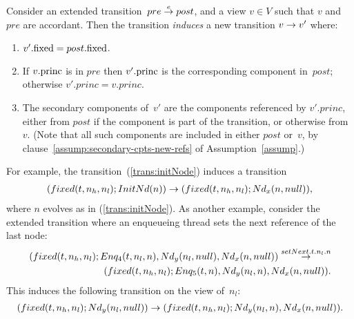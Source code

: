 \begin{definition}
\label{def:induced-transition}
Consider an extended transition~$pre \stackrel{e}\rightarrow post$, and a view $v \in V$
such that $v$ and $pre$ are accordant.  Then the transition \emph{induces} a
new transition $v \stackrel{}\rightarrow v'$ where:
\begin{enumerate}
\item $v'.\mathrm{fixed} = post.\mathrm{fixed}$.

\item If $v.\mathrm{princ}$ is in $pre$ then $v'.\mathrm{princ}$ is the corresponding
  component in~$post$; otherwise $v'.princ = v.princ$.

\item The secondary components of~$v'$ are the components referenced by
  $v'.princ$, either from $post$ if the component is part of the transition,
  or otherwise from~$v$.  (Note that all such components are included in
  either $post$ or~$v$, by clause~\ref{assump:secondary-cpts-new-refs} of
  Assumption~\ref{assump}.)
\end{enumerate}
\end{definition}


For example, the  transition~(\ref{trans:initNode}) induces a transition
\[
\begin{align}
(fixed(t, n_h, n_l); InitNd(n)) \stackrel{}\rightarrow 
  (fixed(t, n_h, n_l); Nd_x(n, null)),
\end{align}
\]
where $n$ evolves as in (\ref{trans:initNode}).
%
As another example, consider the extended transition where an enqueueing
thread sets the next reference of the last node:
\[
\begin{align}
(fixed(t, n_h, n_l);  Enq_4(t, n_l, n), Nd_y(n_l, null), Nd_x(n, null)) 
 \stackrel{setNext.t.n_l.n}\rightarrow \\
\qquad (fixed(t, n_h, n_l);  Enq_5(t, n), Nd_y(n_l, n), Nd_x(n, null)).
\end{align}
\]
This induces the following transition on the view of~$n_l$:
\[
\begin{align}
(fixed(t, n_h, n_l);  \Node_y(n_l, null)) \trans{}  %
  (fixed(t, n_h, n_l);  \Node_y(n_l, n), \Node_x(n, null)).
\end{align}
\]


